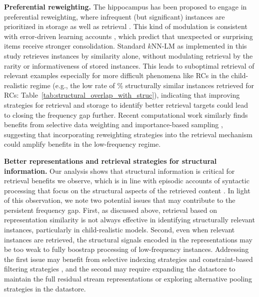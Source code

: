 \noindent \textbf{Preferential reweighting.} 
The hippocampus has been proposed to engage in preferential reweighting, where infrequent (but significant) instances are prioritized in storage as well as retrieval \citep{kumaran2016learning}. This kind of modulation is consistent with error-driven learning accounts \citep{chang2006dual,rescorla1972theory}, which predict that unexpected or surprising items receive stronger consolidation. Standard $k$NN-LM as implemented in this study retrieves instances by similarity alone, without modulating retrieval by the rarity or informativeness of stored instances. This leads to suboptimal retrieval of relevant examples especially for more difficult phenomena like RCs in the child-realistic regime (e.g., the low rate of \% structurally similar instances retrieved for RCs: Table~\ref{tab:structural_overlap_with_struc}), indicating that improving strategies for retrieval and storage to identify better retrieval targets could lead to closing the frequency gap further. Recent computational work similarly finds benefits from selective data weighting \citep{toneva2018empirical} and importance-based sampling \citep{xie2023doremi}, suggesting that incorporating reweighting strategies into the retrieval mechanism could amplify benefits in the low-frequency regime.


\noindent \textbf{Better representations and retrieval strategies for structural information.} 
Our analysis shows that structural information is critical for retrieval benefits we observe, which is in line with episodic accounts of syntactic processing that focus on the structural aspects of the retrieved content \citep{borensztajn2011episodic}. In light of this observation, we note two potential issues that may contribute to the persistent frequency gap. First, as discussed above, retrieval based on representation similarity is not always effective in identifying structurally relevant instances, particularly in child-realistic models. Second, even when relevant instances are retrieved, the structural signals encoded in the representations may be too weak to fully boostrap processing of low-frequency instances. Addressing the first issue may benefit from selective indexing strategies and constraint-based filtering strategies \citep{borgeaud2022improving, izacard2022few}, and the second may require expanding the datastore to maintain the full residual stream representations or exploring alternative pooling strategies in the datastore. %

